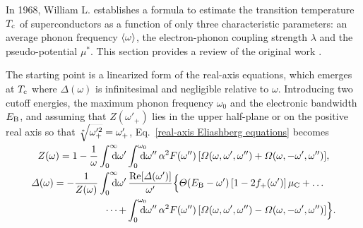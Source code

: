 In 1968, William L.  establishes a formula to estimate the
transition temperature $T \sb{\text{c}}$ of superconductors as a function of only three
characteristic parameters: an average phonon frequency $\langle\omega\rangle$, the
electron-phonon coupling strength $\lambda$ and the 
pseudo-potential $\mu^*$. This section provides a review of the original work
\cite{McMillan68}.

The starting point is a linearized form of the real-axis 
equations, which emerges at $T \sb{\text{c}}$ where $\Delta(\omega)$ is infinitesimal
and negligible relative to $\omega$. Introducing two cutoff energies, the
maximum phonon frequency $\omega_0$ and the electronic bandwidth $E \sb{\text{B}}$, and
assuming that $Z(\omega'_+)$ lies in the upper half-plane or on the positive
real axis so that $\smash{\sqrt[\ast]{\omega'^2_+}} = \omega'_+$,
Eq.~\ref{real-axis Eliashberg equations} becomes
%
\begin{subequations} \label{linearized real-axis equations}
    \begin{align}
        Z(\omega) = 1 - \frac 1 \omega
        \int \from 0 \till \infty \D \omega'
        &\int \from 0 \till{\omega_0} \D \omega'' \, \alpha^2 F(\omega'') \,
        [ \Omega(\omega,  \omega', \omega'')
        + \Omega(\omega, -\omega', \omega'') ],
        \\
        \Delta(\omega) = -\frac 1 {Z(\omega)}
        \int \from 0 \till \infty \D \omega' \,
        \!&\,\frac{\Re[\Delta(\omega')]}{\omega'}
        \Big \{
            \Theta(E \sub B - \omega') \, [1 - 2 f_+(\omega')] \, \mu \sub C
            + \dots
            \\
            \dots +
            &\int \from 0 \till{\omega_0} \D \omega'' \, \alpha^2 F(\omega'') \,
            [ \Omega(\omega,  \omega', \omega'')
            - \Omega(\omega, -\omega', \omega'') ]
        \Big \}.
    \end{align}
\end{subequations}

